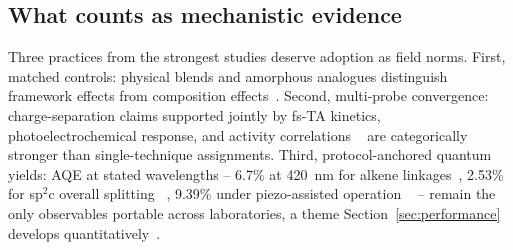 \subsection{What counts as mechanistic evidence}

Three practices from the strongest studies deserve adoption as field norms.
First, matched controls: physical blends and amorphous analogues distinguish
framework effects from composition effects~\cite{xu20202d,mi2021covalent}.
Second, multi-probe convergence: charge-separation claims supported jointly
by fs-TA kinetics, photoelectrochemical response, and activity correlations
~\cite{shen2023efficient,he2023integrated,zhang2023stable} are categorically
stronger than single-technique assignments. Third, protocol-anchored
quantum yields: AQE at stated wavelengths -- 6.7\% at 420~nm for alkene
linkages~\cite{mo2020alkene}, 2.53\% for sp$^2$c overall splitting
~\cite{cheng2023fully}, 9.39\% under piezo-assisted operation
~\cite{gao2025piezoceramics} -- remain the only observables portable across
laboratories, a theme Section~\ref{sec:performance} develops
quantitatively~\cite{zhong2023oligo}.
